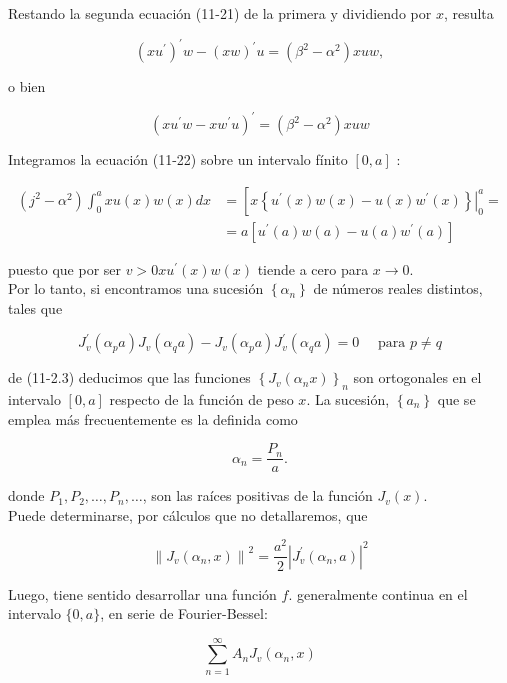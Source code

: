 \documentclass[10pt]{article}
\theoremstyle{plain}
\theoremstyle{definition}
\theoremstyle{remark}
\begin{document}
Restando la segunda ecuación (11-21) de la primera y dividiendo por $x$, resulta

$$
\left(x u^{\prime}\right)^{\prime} w-(x w)^{\prime} u=\left(\beta^{2}-\alpha^{2}\right) x u w,
$$


o bien


\begin{equation*}
\left(x u^{\prime} w-x w^{\prime} u\right)^{\prime}=\left(\beta^{2}-\alpha^{2}\right) x u w \tag{$11\cdot22$}
\end{equation*}


Integramos la ecuación (11-22) sobre un intervalo fínito $[0, a]$ :


\begin{align*}
\left(j^{2}-\alpha^{2}\right) \int_{0}^{a} x u(x) w(x) d x & =\left[\left.x\left\{u^{\prime}(x) w(x)-u(x) w^{\prime}(x)\right\}\right|_{0} ^{a}=\right. \\
& =a\left[u^{\prime}(a) w(a)-u(a) w^{\prime}(a)\right] \tag{11.23}
\end{align*}


puesto que por ser $v>0 x u^{\prime}(x) w(x)$ tiende a cero para $x \rightarrow 0$.\\
Por lo tanto, si encontramos una sucesión $\left\{\alpha_{n}\right\}$ de números reales distintos, tales que

$$
J_{v}^{\prime}\left(\alpha_{p} a\right) J_{v}\left(\alpha_{q} a\right)-J_{v}\left(\alpha_{p} a\right) J_{v}^{\prime}\left(\alpha_{q} a\right)=0 \quad \text { para } p \neq q
$$

de (11-2.3) deducimos que las funciones $\left\{J_{v}\left(\alpha_{n} x\right)\right\}_{n}$ son ortogonales en el intervalo $[0, a]$ respecto de la función de peso $x$. La sucesión, $\left\{a_{n}\right\}$ que se emplea más frecuentemente es la definida como

$$
\alpha_{n}=\frac{P_{n}}{a} .
$$

donde $P_{1}, P_{2}, \ldots, P_{n}, \ldots$, son las raíces positivas de la función $J_{v}(x)$.\\
Puede determinarse, por cálculos que no detallaremos, que

$$
\left\|J_{v}\left(\alpha_{n}, x\right)\right\|^{2}=\frac{a^{2}}{2}\left|J_{v}^{\prime}\left(\alpha_{n}, a\right)\right|^{2}
$$

Luego, tiene sentido desarrollar una función $f$. generalmente continua en el intervalo $\{0, a\}$, en serie de Fourier-Bessel:

$$
\sum_{n=1}^{\infty} A_{n} J_{v}\left(\alpha_{n}, x\right)
$$
\end{document}
